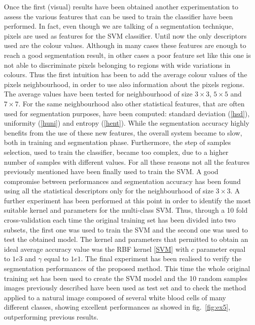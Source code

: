 \documentclass[final,a4paper,12pt,english]{UnicaPhdThesis3}
\begin{document}
	Once the first (visual) results have been obtained another experimentation to assess the various features that can be used to train the classifier have been performed. In fact, even though we are talking of a segmentation technique, pixels are used as features for the SVM classifier. Until now the only descriptors used are the colour values. Although in many cases these features are enough to reach a good segmentation result, in other cases a poor feature set like this one is not able to discriminate pixels belonging to regions with wide variations in colours. Thus the first intuition has been to add the average colour values of the pixels neighbourhood, in order to use also information about the pixels regions. The average values have been tested for neighbourhood of size $3 \times 3$, $5 \times 5$ and $7 \times 7$. For the same neighbourhood also other statistical features, that are often used for segmentation purposes, have been computed: standard deviation (\ref{hsd}), uniformity (\ref{huni}) and entropy (\ref{hent}). While the segmentation accuracy highly benefits from the use of these new features, the overall system became to slow, both in training and segmentation phase. Furthermore, the step of samples selection, used to train the classifier, became too complex, due to a higher number of samples with different values. For all these reasons not all the features previously mentioned have been finally used to train the SVM. A good compromise between performances and segmentation accuracy has been found using all the statistical descriptors only for the neighbourhood of size $3 \times 3$. A further experiment has been performed at this point in order to identify the most suitable kernel and parameters for the multi-class SVM. Thus, through a 10 fold cross-validation each time the original training set has been divided into two subsets, the first one was used to train the SVM and the second one was used to test the obtained model. The kernel and parameters that permitted to obtain an ideal average accuracy value was the RBF kernel \ref{SVM} with $c$ parameter equal to $1e3$ and $\gamma$ equal to $1e1$. 
	The final experiment has been realised to verify the segmentation performances of the proposed method. This time the whole original training set has been used to create the SVM model and the 10 random samples images previously described have been used as test set and to check the method applied to a natural image composed of several white blood cells of many different classes, showing excellent performances as showed in fig.~\ref{fig:ex5}, outperforming previous results. 
	
\end{document}
